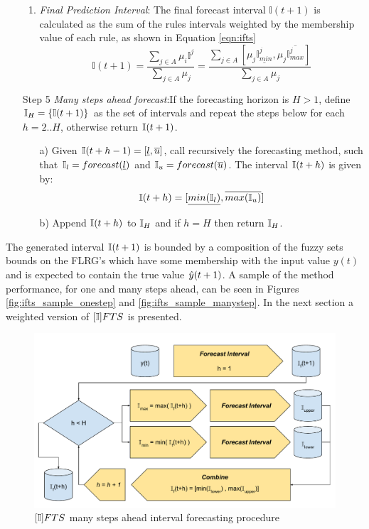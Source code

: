\begin{enumerate}
\begin{enumerate}
\item \textit{Final Prediction Interval}: The final forecast interval $\mathbb{I}(t+1)$ is calculated as the sum of the rules intervals weighted by the membership value of each rule, as shown in Equation \eqref{eqn:ifts}
\begin{equation}
\mathbb{I}(t+1) = \frac{\sum_{j \in A} \mu_i \mathbb{I}^j}{\sum_{j \in A} \mu_j} = \frac{\sum_{j \in A} [\mu_j\underline{\mathbb{I}^j_{min}} , \mu_j\overline{\mathbb{I}^j_{max}}] }{\sum_{j \in A} \mu_j}
\label{eqn:ifts}
\end{equation}
\end{enumerate}
\item[Step 5] \textit{Many steps ahead forecast}:If the forecasting horizon is $H > 1$, define $\mathbb{I}_H = \{\mathbb{I}(t+1)\}$ as the set of intervals and repeat the steps below for each $h=2..H$, otherwise return  $\mathbb{I}(t+1)$.
\begin{enumerate}
    \item[a)]  Given $\mathbb{I}(t+h-1)= [\underline{l},\overline{u}]$, call recursively the forecasting method, such that $\mathbb{I}_l = forecast(\underline{l})$ and $\mathbb{I}_u = forecast(\overline{u})$. The interval $\mathbb{I}(t+h)$ is given by:
    \begin{equation}
        \mathbb{I}(t+h)= [\underline{min(\mathbb{I}_l)},\overline{max(\mathbb{I}_u)}]
    \end{equation}
    \item[b)] Append $\mathbb{I}(t+h)$ to $\mathbb{I}_H$ and if $h = H$ then return $\mathbb{I}_H$.
\end{enumerate}
\end{enumerate}

The generated interval $\mathbb{I}(t+1)$ is bounded by a composition of the fuzzy sets bounds on the FLRG's which have some membership with the input value $y(t)$ and is expected to contain the true value $\hat{y}(t+1)$. A sample of the method performance, for one and many steps ahead, can be seen in Figures \ref{fig:ifts_sample_onestep} and \ref{fig:ifts_sample_manystep}. In the next section a weighted version of $[\mathbb{I}]FTS$ is presented. 

\begin{figure}[htb]
    \centering
    \includegraphics[width=\textwidth]{figures/ifts_many_steps.pdf}
    \caption{$[\mathbb{I}]FTS$ many steps ahead interval forecasting procedure}
    \label{fig:ifts_many_steps}
\end{figure}

